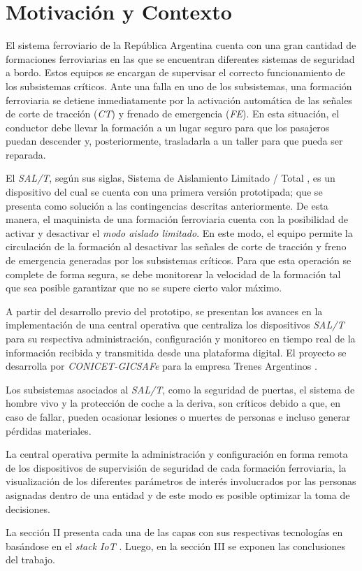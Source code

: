 
\section{Motivación y Contexto}

El sistema ferroviario de la República Argentina cuenta con una gran cantidad de formaciones ferroviarias en las que se encuentran diferentes sistemas de seguridad a bordo. Estos equipos se encargan de supervisar el correcto funcionamiento de los subsistemas críticos. Ante una falla en uno de los subsistemas, una formación ferroviaria se detiene inmediatamente por la activación automática de las señales de corte de tracción (\textit{CT}) y frenado de emergencia (\textit{FE}). En esta situación, el conductor debe llevar la formación a un lugar seguro para que los pasajeros puedan descender y, posteriormente, trasladarla a un taller para que pueda ser reparada.

El \textit{SAL/T}, según sus siglas, Sistema de Aislamiento Limitado / Total \cite{b1}, es un dispositivo del cual se cuenta con una primera versión prototipada; que se presenta como solución a las contingencias descritas anteriormente. De esta manera, el maquinista de una formación ferroviaria cuenta con la posibilidad de activar y desactivar el \textit{modo aislado limitado}. En este modo, el equipo permite la circulación de la formación al desactivar las señales de corte de tracción y freno de emergencia generadas por los subsistemas críticos. Para que esta operación se complete de forma segura, se debe monitorear la velocidad de la formación tal que sea posible garantizar que no se supere cierto valor máximo.

A partir del desarrollo previo del prototipo, se presentan los avances en la implementación de una central operativa que centraliza los dispositivos \textit{SAL/T} para su respectiva administración, configuración y monitoreo en tiempo real de la información recibida y transmitida desde una plataforma digital. El proyecto se desarrolla por \textit{CONICET-GICSAFe} \cite{b2} para la empresa Trenes Argentinos \cite{b3}.

Los subsistemas asociados al \textit{SAL/T}, como la seguridad de puertas, el sistema de hombre vivo y la protección de coche a la deriva, son críticos debido a que, en caso de fallar, pueden ocasionar lesiones o muertes de personas e incluso generar pérdidas materiales. 

La central operativa permite la administración y configuración en forma remota de los dispositivos de supervisión de seguridad de cada formación ferroviaria, la visualización de los diferentes parámetros de interés involucrados por las personas asignadas dentro de una entidad y de este modo es posible optimizar la toma de decisiones. 

La sección II presenta cada una de las capas con sus respectivas tecnologías en basándose en el \textit{stack IoT} \cite{b4}. Luego, en la sección III se exponen las conclusiones del trabajo.


